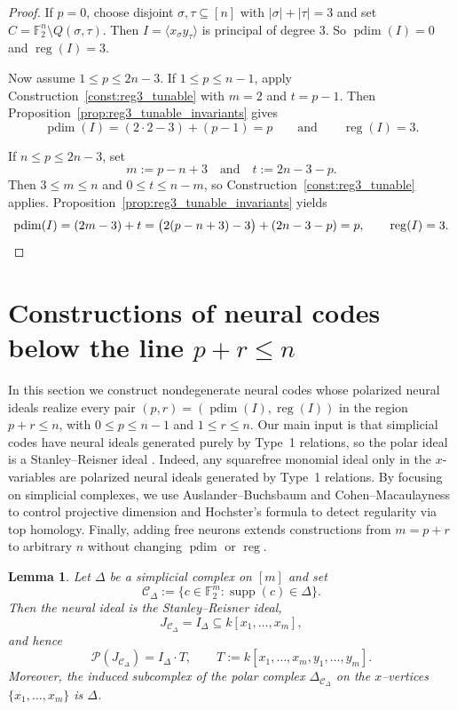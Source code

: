 \documentclass[12pt]{amsart}
\newtheorem{lemma}[theorem]{Lemma}
\theoremstyle{remark}
\theoremstyle{definition}
\DeclareMathOperator{\reg}{reg}
\DeclareMathOperator{\pd}{pdim}
\DeclareMathOperator{\supp}{supp}
\newcommand{\F}{\mathbb{F}}
\newcommand{\C}{\mathcal{C}}
\def\P{{\mathcal P}}
\begin{document}
\begin{proof}
If $p=0$, choose disjoint $\sigma,\tau\subseteq[n]$ with $|\sigma|+|\tau|=3$ and set
$C=\F_2^n\setminus Q(\sigma,\tau)$. Then $I=\langle x_\sigma y_\tau\rangle$ is principal of degree $3$. So $\pd(I)=0$ and $\reg(I)=3$.

Now assume $1\le p\le 2n-3$.
If $1\le p\le n-1$, apply Construction~\ref{const:reg3_tunable} with $m=2$ and $t=p-1$.
Then Proposition~\ref{prop:reg3_tunable_invariants} gives
\[
\pd(I)=(2\cdot 2-3)+(p-1)=p
\qquad\text{and}\qquad
\reg(I)=3.
\]

If $n\le p\le 2n-3$, set
\[
m:=p-n+3 \quad\text{and}\quad t:=2n-3-p.
\]
Then $3\le m\le n$ and $0\le t\le n-m$, so Construction~\ref{const:reg3_tunable} applies.
Proposition~\ref{prop:reg3_tunable_invariants} yields
\[
\pd(I)=(2m-3)+t
=\bigl(2(p-n+3)-3\bigr)+(2n-3-p)=p,
\qquad
\reg(I)=3. \qedhere
\]
\end{proof}


\section{Constructions of neural codes below the line $p+r\le n$}\label{sec:last}

In this section we construct nondegenerate neural codes whose polarized neural ideals realize every pair
$(p,r)=(\pd(I),\reg(I))$ in the region $p+r\le n$, with $0\le p\le n-1$ and $1\le r\le n$.
Our main input is that simplicial codes have neural ideals generated purely by Type~1 relations, so the
polar ideal is a Stanley--Reisner ideal \cite[Lemma~4.4]{smb}.  Indeed,  any squarefree monomial ideal only in the $x$-variables are polarized neural ideals generated by Type~1 relations. By focusing on simplicial complexes, we use
Auslander--Buchsbaum and Cohen--Macaulayness to control projective dimension and Hochster’s formula to detect
regularity via top homology.  Finally, adding free neurons extends constructions from $m=p+r$ to arbitrary
$n$ without changing $\pd$ or $\reg$.



\begin{lemma}\label{lem:simplicial-code-SR}
Let $\Delta$ be a simplicial complex on $[m]$ and set
\[
\C_\Delta:=\{c\in\F_2^m:\supp(c)\in\Delta\}.
\]
Then the neural ideal is the Stanley--Reisner ideal,
\[
J_{\C_\Delta}=I_\Delta\subseteq k[x_1,\dots,x_m],
\]
and hence
\[
\P(J_{\C_\Delta})  =  I_\Delta\cdot T,
\qquad
T:=k[x_1,\dots,x_m,y_1,\dots,y_m].
\]
Moreover, the induced subcomplex of the polar complex $\Delta_{\C_\Delta}$ on the $x$--vertices
$\{x_1,\dots,x_m\}$ is $\Delta$.
\end{lemma}
\end{document}

